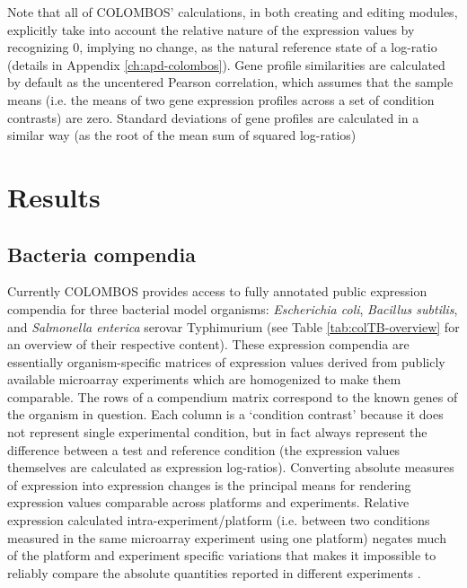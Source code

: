 Note that all of COLOMBOS' calculations, in both creating and editing modules, 
explicitly take into account the relative nature of the expression values by 
recognizing $0$, implying no change, as the natural reference state of a 
log-ratio (details in Appendix \ref{ch:apd-colombos}). 
Gene profile similarities are calculated by default as the uncentered Pearson 
correlation, which assumes that the sample means (i.e. the means of two gene 
expression profiles across a set of condition contrasts) are zero. Standard 
deviations of gene profiles are calculated in a similar way (as the root of the 
mean sum of squared log-ratios)



\section{Results}

\subsection{Bacteria compendia}\label{sec:colombos-comp}

Currently COLOMBOS provides access to fully annotated public expression 
compendia for three bacterial model organisms: {\it Escherichia coli}, {\it 
Bacillus subtilis}, and {\it Salmonella enterica} serovar Typhimurium (see 
Table \ref{tab:colTB-overview} for an overview of their respective 
content). 
These expression compendia are essentially organism-specific matrices of 
expression values derived from publicly available microarray experiments which 
are homogenized to make them comparable. The rows of a compendium matrix 
correspond to the known genes of the organism in question. Each column is a 
`condition contrast' because it does not represent single experimental 
condition, but in fact always represent the difference between a 
test and reference condition (the expression values themselves are calculated 
as expression log-ratios). 
%
Converting absolute measures of expression into 
expression changes is the principal means for rendering expression values 
comparable across platforms and experiments. Relative expression calculated 
intra-experiment/platform (i.e. between two conditions measured in the same 
microarray experiment using one platform) negates much of the platform and 
experiment specific variations that makes it impossible to reliably compare the 
absolute quantities reported in different experiments \cite{Shi2006}.

